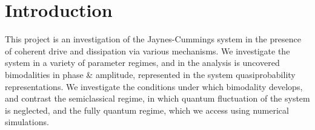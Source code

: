 \section{Introduction}
  This project is an investigation of the Jaynes-Cummings system in the presence of coherent drive and dissipation via various mechanisms. We investigate the system in a variety of parameter regimes, and in the analysis is uncovered bimodalities in phase \& amplitude, represented in the system quasiprobability representations. We investigate the conditions under which bimodality develops, and contrast the semiclassical regime, in which quantum fluctuation of the system is neglected, and the fully quantum regime, which we access using numerical simulations.
